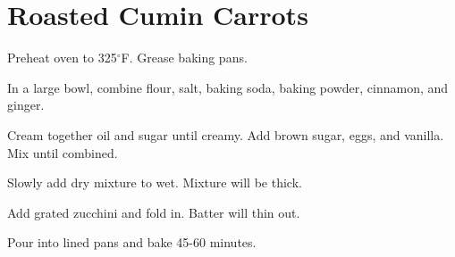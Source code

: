 \section{Roasted Cumin Carrots}
\begin{recipe}




	Preheat oven to 325$^{\circ}$F. Grease baking pans.

	In a large bowl, combine flour, salt, baking soda, baking powder, cinnamon, and ginger.

	Cream together oil and sugar until creamy. Add brown sugar, eggs, and vanilla. Mix until combined.

	Slowly add dry mixture to wet. Mixture will be thick.

	Add grated zucchini and fold in. Batter will thin out.

	Pour into lined pans and bake 45-60 minutes.



\end{recipe}
